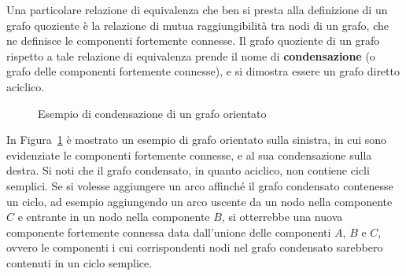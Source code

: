 Una particolare relazione di equivalenza che ben si presta alla definizione di un grafo quoziente \`e la relazione di
mutua raggiungibilit\`a tra nodi di un grafo, che ne definisce le componenti fortemente connesse.
Il grafo quoziente di un grafo rispetto a tale relazione di equivalenza prende il nome di
\textbf{condensazione} (o grafo delle componenti fortemente connesse), e si dimostra essere un grafo diretto aciclico.

\begin{figure}[h]
    \centering
    
    \caption{Esempio di condensazione di un grafo orientato}
    \label{fig:condensation-example}
\end{figure}

In Figura~\ref{fig:condensation-example} \`e mostrato un esempio di grafo orientato sulla sinistra, in cui
sono evidenziate le componenti fortemente connesse, e al sua condensazione sulla destra.
Si noti che il grafo condensato, in quanto aciclico, non contiene cicli semplici.
Se si volesse aggiungere un arco affinché il grafo condensato contenesse un ciclo, ad esempio aggiungendo un arco
uscente da un nodo nella componente $C$ e entrante in un nodo nella componente $B$, si otterrebbe una nuova componente
fortemente connessa data dall'unione delle componenti $A$, $B$ e $C$, ovvero le componenti i cui corrispondenti nodi
nel grafo condensato sarebbero contenuti in un ciclo semplice.